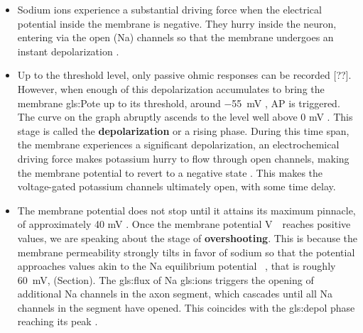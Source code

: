 \documentclass[class={myRUCProject}, crop=false]{standalone}
\begin{document}
\begin{itemize}
\item Sodium ions experience a substantial driving force when the electrical potential inside the membrane is negative. They hurry inside the neuron, entering via the open (\gls{Na}) channels so that the membrane undergoes an instant depolarization \cite{wood1996neuroscience}. 

\item Up to the threshold level, only passive ohmic responses can be recorded [??]. However, when enough of this depolarization accumulates to bring the membrane \gls{gls:Pote} up to its threshold, around \qty{-55}{\mV} \cite{Hammond2015ch3}, AP is triggered. The curve on the graph abruptly ascends to the level well above 0 mV \cite{ramachandran2002encyclopedia}. This stage is called the \textbf{depolarization} or a rising phase. During this time span, the membrane experiences a significant depolarization, an electrochemical driving force makes potassium hurry to flow through open channels, making the membrane potential to revert to a negative state \cite{wood1996neuroscience}. This makes the voltage-gated potassium channels ultimately open, with some time delay. 

\item The membrane potential does not stop until it attains its maximum pinnacle, of approximately 40 mV \cite{wood1996neuroscience}. Once the membrane potential \unit{\V\membrane}\ reaches positive values, we are speaking about the stage of \textbf{overshooting}. This is because the membrane permeability strongly tilts in favor of sodium so that the potential approaches values akin to the \gls{Na} equilibrium potential \unit{\equi\sodium}\cite{wood1996neuroscience}, that is roughly \qty{60}{\mV}, (Section). The \gls{gls:flux} of \gls{Na} \glspl{gls:ion} triggers the opening of additional \gls{Na} channels in the axon segment, which cascades until all \gls{Na} channels in the segment have opened. This coincides with the \gls{gls:depol} phase reaching its peak \cite{Hammond2015ch4}.

\begin{figure}[b]


\end{figure}
\end{itemize}
\end{document}

